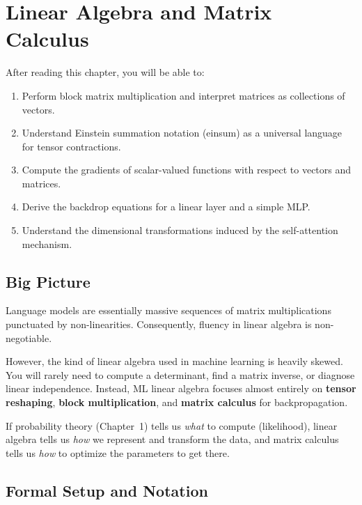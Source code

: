 \chapter{Linear Algebra and Matrix Calculus}
\label{ch:02}

\begin{keyinsight}
After reading this chapter, you will be able to:
\begin{enumerate}
  \item Perform block matrix multiplication and interpret matrices as collections of vectors.
  \item Understand Einstein summation notation (einsum) as a universal language for tensor contractions.
  \item Compute the gradients of scalar-valued functions with respect to vectors and matrices.
  \item Derive the backdrop equations for a linear layer and a simple MLP.
  \item Understand the dimensional transformations induced by the self-attention mechanism.
\end{enumerate}
\end{keyinsight}

\section{Big Picture}
\label{ch:02:sec:big_picture}

Language models are essentially massive sequences of matrix multiplications punctuated by non-linearities. Consequently, fluency in linear algebra is non-negotiable. 

However, the kind of linear algebra used in machine learning is heavily skewed. You will rarely need to compute a determinant, find a matrix inverse, or diagnose linear independence. Instead, ML linear algebra focuses almost entirely on \textbf{tensor reshaping}, \textbf{block multiplication}, and \textbf{matrix calculus} for backpropagation. 

If probability theory (Chapter~1) tells us \emph{what} to compute (likelihood), linear algebra tells us \emph{how} we represent and transform the data, and matrix calculus tells us \emph{how} to optimize the parameters to get there.

\section{Formal Setup and Notation}
\label{ch:02:sec:setup}

